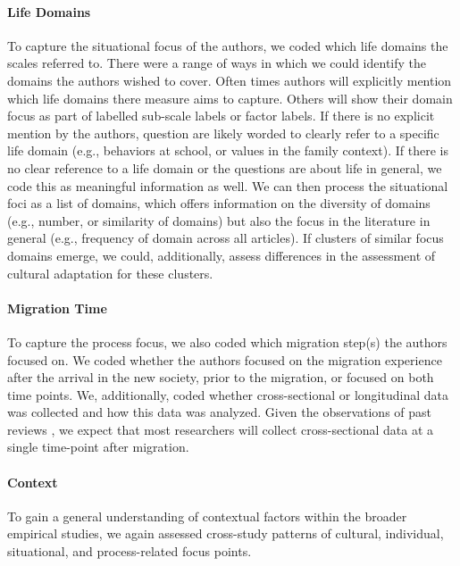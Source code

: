 \documentclass[man, 12pt, a4paper]{apa7}
\begin{document}
\paragraph{Life Domains}
To capture the situational focus of the authors, we coded which life domains the scales referred to. There were a range of ways in which we could identify the domains the authors wished to cover. Often times authors will explicitly mention which life domains there measure aims to capture. Others will show their domain focus as part of labelled sub-scale labels or factor labels. If there is no explicit mention by the authors, question are likely worded to clearly refer to a specific life domain (e.g., behaviors at school, or values in the family context). If there is no clear reference to a life domain or the questions are about life in general, we code this as meaningful information as well. We can then process the situational foci as a list of domains, which offers information on the diversity of domains (e.g., number, or similarity of domains) but also the focus in the literature in general (e.g., frequency of domain across all articles). If clusters of similar focus domains emerge, we could, additionally, assess differences in the assessment of cultural adaptation for these clusters.

\paragraph{Migration Time}
To capture the process focus, we also coded which migration step(s) the authors focused on. We coded whether the authors focused on the migration experience after the arrival in the new society, prior to the migration, or focused on both time points. We, additionally, coded whether cross-sectional or longitudinal data was collected and how this data was analyzed. Given the observations of past reviews \citep[e.g.,][]{Brown2011, Ward2019}, we expect that most researchers will collect cross-sectional data at a single time-point after migration.













\paragraph{Context}
To gain a general understanding of contextual factors within the broader empirical studies, we again assessed cross-study patterns of cultural, individual, situational, and process-related focus points.
\end{document}
